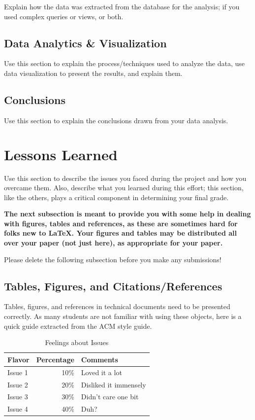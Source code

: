 \documentclass[12pt]{article}
\begin{document}
Explain how the data was extracted from the database for the analysis; if you used complex queries or views, or both.
\subsection{Data Analytics \& Visualization}
Use this section to explain the process/techniques used to analyze the data, use data visualization to present the results, and explain them.
\subsection{Conclusions}
Use this section to explain the conclusions drawn from your data analysis.\\
\section{Lessons Learned}
Use this section to describe the issues you faced during the project and how you overcame them. Also, describe what you learned during this effort; this section, like the others, plays a critical component in determining your final grade.\\

{\bf The next subsection is meant to provide you with some help in
  dealing with figures, tables and references, as these are sometimes
  hard for folks new to \LaTeX. Your figures and tables
  may be distributed all over your paper (not just here), as appropriate for your paper.

  Please delete the following subsection before you make any submissions!}

\subsection{Tables, Figures, and Citations/References}

Tables, figures, and references in technical
documents need to be presented correctly. As many students
are not familiar with using these objects, here is a quick
guide extracted from the ACM style guide.

\begin{table}
\centering
\caption{Feelings about Issues}
\label{SAMPLE TABLE}
\begin{tabular}{|l|r|l|} \hline
Flavor&Percentage&Comments\\ \hline
Issue 1 &  10\% & Loved it a lot\\ \hline
Issue 2 &  20\% & Disliked it immensely\\ \hline
Issue 3 &  30\% & Didn't care one bit\\ \hline
Issue 4 &  40\% & Duh?\\ \hline
\end{tabular}
\end{table}
\end{document}
